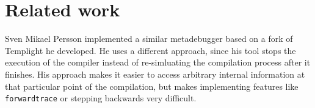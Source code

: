 
\chapter{Related work}

Sven Mikael Persson implemented a similar metadebugger based on a fork of
Templight he developed.\cite{persson-templight} He uses a different approach,
since his tool stops the execution of the compiler instead of re-simluating
the compilation process after it finishes. His approach makes it easier to
access arbitrary internal information at that particular point of the
compilation, but makes implementing features like \texttt{forwardtrace} or
stepping backwards very difficult.

